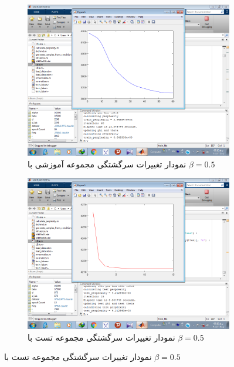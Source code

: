 \documentclass[11.5pt,a4paper]{article}
\begin{document}
\begin{figure}[h]
\center
	\begin{subfigure}{.45\textwidth}
		\includegraphics[scale=0.25]{Imgs/k3_b05_a003_25s_ptr3648938.png}
		\caption{نمودار تغییرات سرگشتگی مجموعه‌ آموزشی با $\beta = 0.5$}
	\end{subfigure}
	\begin{subfigure}{.45\textwidth}
		\includegraphics[scale=0.25]{Imgs/k3_b05_a003_8s_pts4212840.png}
		\caption{نمودار تغییرات سرگشتگی مجموعه‌ تست با $\beta = 0.5$}
	\end{subfigure}


\end{figure}
\end{document}
